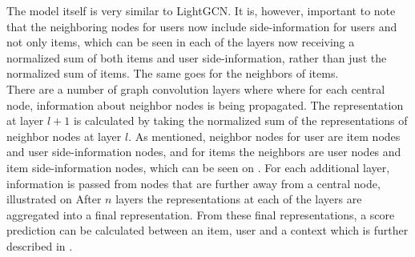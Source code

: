 The model itself is very similar to LightGCN.
It is, however, important to note that the neighboring nodes for users now include side-information for users and not only items, which can be seen in each of the layers now receiving a normalized sum of both items and user side-information, rather than just the normalized sum of items.
The same goes for the neighbors of items.
\\
There are a number of graph convolution layers where where for each central node, information about neighbor nodes is being propagated.
The representation at layer $l+1$ is calculated by taking the normalized sum of the representations of neighbor nodes at layer $l$. 
As mentioned, neighbor nodes for user are item nodes and user side-information nodes, and for items the neighbors are user nodes and item side-information nodes, which can be seen on .
For each additional layer, information is passed from nodes that are further away from a central node, illustrated on 
After $n$ layers the representations at each of the layers are aggregated into a final representation.
From these final representations, a score prediction can be calculated between an item, user and a context which is further described in .



